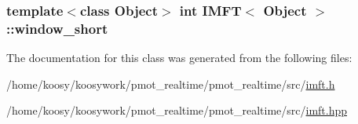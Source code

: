 \hypertarget{class_i_m_f_t_ad2198a7256eb82e0c5ad0362abc5290a}{
\subsubsection[{window\-\_\-short}]{\setlength{\rightskip}{0pt plus 5cm}template$<$class \-Object$>$ int {\bf \-I\-M\-F\-T}$<$ \-Object $>$\-::{\bf window\-\_\-short}}}\label{class_i_m_f_t_ad2198a7256eb82e0c5ad0362abc5290a}


\-The documentation for this class was generated from the following files\-:\begin{DoxyCompactItemize}
\item 
/home/koosy/koosywork/pmot\-\_\-realtime/pmot\-\_\-realtime/src/\hyperlink{imft_8h}{imft.\-h}\item 
/home/koosy/koosywork/pmot\-\_\-realtime/pmot\-\_\-realtime/src/\hyperlink{imft_8hpp}{imft.\-hpp}\end{DoxyCompactItemize}
